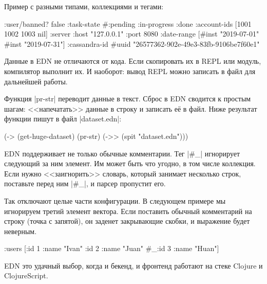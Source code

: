 Пример с разными типами, коллекциями и тегами:

\begin{english}
  \begin{clojure}
{:user/banned? false
 :task-state #{:pending :in-progress :done}
 :account-ids [1001 1002 1003 nil]
 :server {:host "127.0.0.1" :port 8080}
 :date-range [#inst "2019-07-01" #inst "2019-07-31"]
 :cassandra-id #uuid "26577362-902e-49e3-83fb-9106be7f60e1"}
  \end{clojure}
\end{english}

Данные в EDN не отличаются от кода. Если скопировать их в REPL или модуль,
компилятор выполнит их. И наоборот: вывод REPL можно записать в файл для
дальнейшей работы.

Функция \spverb|pr-str| переводит данные в текст. Сброс в EDN сводится к простым
шагам: <<напечатать>> данные в строку и записать е\"{е} в файл. Ниже результат
функции пишут в файл \spverb|dataset.edn|:

\begin{english}
  \begin{clojure}
(-> (get-huge-dataset)
    (pr-str)
    (->> (spit "dataset.edn")))
  \end{clojure}
\end{english}


EDN поддерживает не только обычные комментарии. Тег \spverb|#_| игнорирует
следующий за ним элемент. Им может быть что угодно, в том числе коллекция. Если
нужно <<заигнорить>> словарь, который занимает несколько строк, поставьте перед
ним \spverb|#_|, и парсер пропустит его.


Так отключают целые части конфигурации. В следующем примере мы игнорируем третий
элемент вектора. Если поставить обычный комментарий на строку (точка с запятой),
он заденет закрывающие скобки, и выражение будет неверным.

\begin{english}
  \begin{clojure}
{:users [{:id 1 :name "Ivan"}
         {:id 2 :name "Juan"}
         #_{:id 3 :name "Huan"}]}
  \end{clojure}
\end{english}

EDN это удачный выбор, когда и бекенд, и фронтенд работают на стеке Clojure и
ClojureScript.

